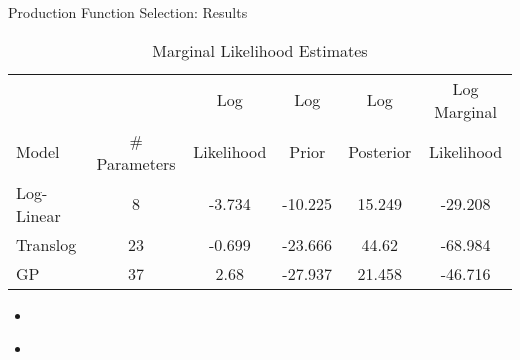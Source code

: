\documentclass{beamer}
\begin{document}
\begin{frame}{Production Function Selection: Results}
\begin{table}[!h]
	\footnotesize
	\centering
	\begin{tabular}{l|c|c|c|c|c}
		&  & Log & Log & Log & Log Marginal \\ 
		Model & \# Parameters & Likelihood & Prior & Posterior & Likelihood \\ 
		\hline
		\hline
		Log-Linear & 8 & -3.734 & -10.225 & 15.249 & -29.208 \\ 
		Translog & 23 & -0.699 & -23.666 & 44.62 & -68.984 \\ 
		GP & 37 & 2.68 & -27.937 & 21.458 & -46.716 \\ 
		\hline
	\end{tabular}
	\caption{Marginal Likelihood Estimates} 
	\label{tab:GPSF-ML}
\end{table}
\begin{itemize}
	\item 
\end{itemize}
\end{frame}

\begin{frame}{}
\begin{itemize}
	\item 
\end{itemize}
\end{frame}
\end{document}

